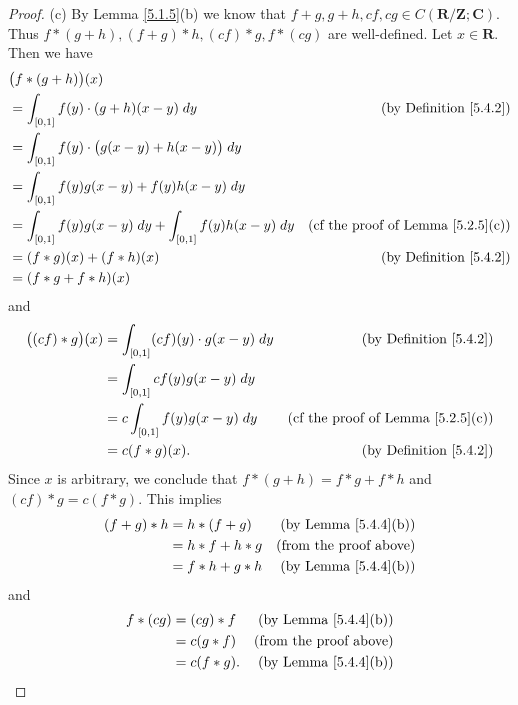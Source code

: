 \begin{proof}{(c)}
    By Lemma \ref{5.1.5}(b) we know that \(f + g, g + h, cf, cg \in C(\mathbf{R} / \mathbf{Z} ; \mathbf{C})\).
    Thus \(f * (g + h), (f + g) * h, (cf) * g, f * (cg)\) are well-defined.
    Let \(x \in \mathbf{R}\).
    Then we have
    \begin{align*}
         & \big(f * (g + h)\big)(x)                                                                                                \\
         & = \int_{[0, 1]} f(y) \cdot (g + h)(x - y) \; dy                         & \text{(by Definition \ref{5.4.2})}            \\
         & = \int_{[0, 1]} f(y) \cdot \big(g(x - y) + h(x - y)\big) \; dy                                                          \\
         & = \int_{[0, 1]} f(y) g(x - y) + f(y) h(x - y) \; dy                                                                     \\
         & = \int_{[0, 1]} f(y) g(x - y) \; dy + \int_{[0, 1]} f(y) h(x - y) \; dy & \text{(cf the proof of Lemma \ref{5.2.5}(c))} \\
         & = (f * g)(x) + (f * h)(x)                                               & \text{(by Definition \ref{5.4.2})}            \\
         & = (f * g + f * h)(x)
    \end{align*}
    and
    \begin{align*}
        \big((cf) * g\big)(x) & = \int_{[0, 1]} (cf)(y) \cdot g(x - y) \; dy & \text{(by Definition \ref{5.4.2})}            \\
                              & = \int_{[0, 1]} c f(y) g(x - y) \; dy                                                        \\
                              & = c \int_{[0, 1]} f(y) g(x - y) \; dy        & \text{(cf the proof of Lemma \ref{5.2.5}(c))} \\
                              & = c (f * g)(x).                              & \text{(by Definition \ref{5.4.2})}
    \end{align*}
    Since \(x\) is arbitrary, we conclude that \(f * (g + h) = f * g + f * h\) and \((cf) * g = c (f * g)\).
    This implies
    \begin{align*}
        (f + g) * h & = h * (f + g)   & \text{(by Lemma \ref{5.4.4}(b))} \\
                    & = h * f + h * g & \text{(from the proof above)}    \\
                    & = f * h + g * h & \text{(by Lemma \ref{5.4.4}(b))}
    \end{align*}
    and
    \begin{align*}
        f * (cg) & = (cg) * f  & \text{(by Lemma \ref{5.4.4}(b))} \\
                 & = c(g * f)  & \text{(from the proof above)}    \\
                 & = c(f * g). & \text{(by Lemma \ref{5.4.4}(b))}
    \end{align*}
\end{proof}

